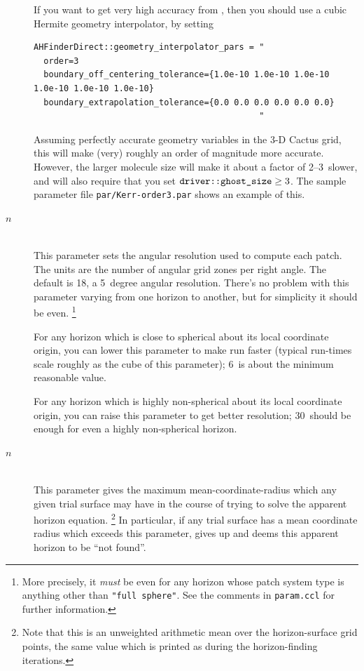 \begin{description}
	If you want to get very high accuracy from ,
	then you should use a cubic Hermite geometry interpolator, by
	setting
\begin{verbatim}
AHFinderDirect::geometry_interpolator_pars = "
  order=3
  boundary_off_centering_tolerance={1.0e-10 1.0e-10 1.0e-10 1.0e-10 1.0e-10 1.0e-10}
  boundary_extrapolation_tolerance={0.0 0.0 0.0 0.0 0.0 0.0}
                                             "
\end{verbatim}
	Assuming perfectly accurate geometry variables in the 3-D Cactus grid,
	this will make  (very) roughly an order
	of magnitude more accurate.  However, the larger molecule size
	will make it about a factor of 2--3~slower, and will also require
	that you set $\verb|driver::ghost_size| \ge 3$.
	The sample parameter file \verb|par/Kerr-order3.par|
	shows an example of this.

\item[\code{N\_zones\_per\_right\_angle[}$n$\code{]}]
\mbox{}\\
	This parameter sets the angular resolution used to compute
	each patch.  The units are the number of angular grid zones
	per right angle.  The default is 18, \ie{} a 5~degree angular
	resolution.  There's no problem with this parameter varying
	from one horizon to another, but for simplicity it should be
	even.%
\footnote{%
	 More precisely, it {\em must\/} be even for
	 any horizon whose patch system type is anything
	 other than {\tt "full sphere"}.  See the comments
	 in {\tt param.ccl} for further information.%
	 }%

{}	For any horizon which is close to spherical about its
	local coordinate origin, you can lower this parameter to make
	 run faster (typical run-times scale
	roughly as the cube of this parameter); 6~is about the
	minimum reasonable value.

	For any horizon which is highly non-spherical about its
	local coordinate origin, you can raise this parameter to
	get better resolution; 30~should be enough for even a
	highly non-spherical horizon.

\item[\code{max\_allowable\_horizon\_radius[}$n$\code{]}]
\mbox{}\\
	This parameter gives the maximum mean-coordinate-radius
	which any given trial surface may have in the course of
	trying to solve the apparent horizon equation.%
\footnote{%
	 Note that this is an unweighted arithmetic
	 mean over the horizon-surface grid points,
	 the same value which is printed as 
	 during the horizon-finding iterations.
	 }%
{}	In particular, if any trial surface has a mean coordinate radius
	which exceeds this parameter,  gives up
	and deems this apparent horizon to be ``not found''.


\end{description}
